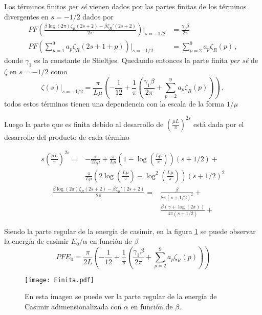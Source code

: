 Los términos finitos {\it per sé} vienen dados por las partes finitas de los términos divergentes en $s=-1/2$ dados por
\begin{align}\label{cortar}
PF \left(
	\frac{\beta \log (2 \pi) \zeta _R (2s+2) -
	\beta \zeta _R ' (2s+2)}{2 \pi } 
		\right) \Bigg| _{s=-1/2}
	&= 
	  \frac{ \gamma _1 \beta}{2 \pi }  \\
PF \left( 
		\sum _{p=1} ^{9} a _p \zeta _R (2s+1+p)
		\right) \Bigg| _{s=-1/2 }
	&= \sum _{p=2} ^{9} a _p \zeta _R (p)
	\, ,
\end{align}
donde $\gamma _1 $ es la constante de Stieltjes. Quedando entonces la parte finita {\it per sé}  de $\zeta$ en $s=-1/2$ como
\begin{equation}
 \zeta (s) \Big| _{s=-1/2} = \frac{\pi}{L \mu}
					\left(
							- \frac{1}{12} +
							\frac{1}{\pi } \left(
											\frac{\gamma _1 \beta}{2 \pi} + 
											\sum _{p=2} ^{9} a _p \zeta _R (p)
												\right)
							\right) 
							\, ,
\end{equation}
todos estos términos tienen una dependencia con la escala de la forma $1/ \mu$

Luego la parte que es finita debido al desarrollo de $ \left( \frac{\mu L}{\pi}\right) ^{2s}$ está dada por el desarrollo del producto de cada término

\begin{align}
s \left( \frac{\mu L}{\pi} \right) ^{2s}  = &
										- \frac{\pi}{2 L \mu} +
										\frac{ \pi }{L \mu } \left( 1 - \log \left( \frac{L \mu }{\pi } \right) \right) (s+1/2)  + 
										\nonumber \\
										& \frac{ \pi}{L \mu} \left( 2 \log \left( \frac{L \mu}{\pi}\right)- 
										  \log ^2 \left( \frac{L \mu}{\pi} \right) \right) (s+1/2) ^2 
\end{align}
\begin{align}
\frac{\beta \log (2 \pi) \zeta _R (2s+2) - \beta \zeta _R ' (2s+2)}{2 \pi } =  
				& \frac{\beta}{8 \pi (s+1/2) ^2} + \nonumber \\
				& \frac{\beta ( \gamma + \log (2 \pi ) )}{4 \pi (s+1/2)} + 
\end{align}


Siendo la parte regular de la energía de casimir, en la figura \ref{fig.finita} se puede observar la energía de casimir $E _0 / \alpha$ en función de $\beta$
\begin{equation}
PF E_0 = 
\frac{\pi}{2 L }
					\left(
							- \frac{1}{12} +
							\frac{1}{\pi } \left(
											\frac{\gamma _1 \beta}{2 \pi} + 
											\sum _{p=2} ^{9} a _p \zeta _R (p)
												\right)
							\right) 
\end{equation}



\begin{figure}
\centering
\texttt{[image: Finita.pdf]}
\caption{En esta imagen se puede ver la parte regular de la energía de Casimir adimensionalizada con $\alpha$ en función de $\beta$. }
\label{fig.finita}
\end{figure}





